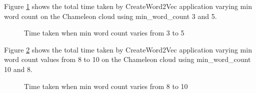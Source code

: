 Figure \ref{fig:compare_mwc_5_3} shows the total time taken by CreateWord2Vec
application varying min word count on the Chameleon cloud using 
min\_word\_count 3 and 5.
\begin{figure}[htbp]
\centering
{}
\caption{Time taken when min word count varies from 3 to 5}
\label{fig:compare_mwc_5_3}
\end{figure}

Figure \ref{fig:compare_mwc_10_8} shows the total time taken by CreateWord2Vec
application varying min word count values from 8 to 10 on the Chameleon cloud using 
min\_word\_count 10 and 8.
\begin{figure}[htbp]
\centering
{}
\caption{Time taken when min word count varies from 8 to 10}
\label{fig:compare_mwc_10_8}
\end{figure}



